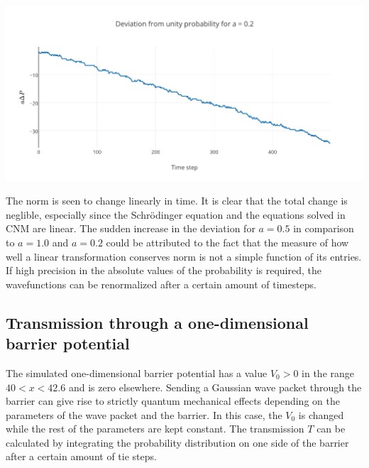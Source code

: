 \begin{Figure}
    \centering
    \includegraphics[width=\linewidth]{norma02.pdf}
    \label{fig:distancea02}
\end{Figure} The norm is seen to change linearly in time. It is clear that the total change is neglible, especially since the Schr\"{o}dinger equation and the equations solved in CNM are linear. The sudden increase in the deviation for $a=0.5$ in comparison to $a=1.0$ and $a=0.2$ could be attributed to the fact that the measure of how well a linear transformation conserves norm is not a simple function of its entries. If high precision in the absolute values of the probability is required, the wavefunctions can be renormalized after a certain amount of timesteps.

\subsection*{Transmission through a one-dimensional barrier potential}
The simulated one-dimensional barrier potential has a value $V_0>0$ in the range $40<x<42.6$ and is zero elsewhere. Sending a Gaussian wave packet through the barrier can give rise to strictly quantum mechanical effects depending on the parameters of the wave packet and the barrier. In this case, the $V_0$ is changed while the rest of the parameters are kept constant. The transmission $T$ can be calculated by integrating the probability distribution on one side of the barrier after a certain amount of tie steps.
